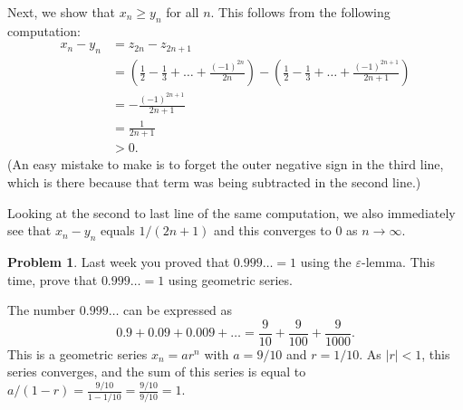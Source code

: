 \documentclass[11pt,oneside]{amsart}
\theoremstyle{definition}
\newtheorem{problem}{Problem}
\theoremstyle{plain}
\newcommand{\eps}{\varepsilon}
\begin{document}
\begin{solution}
        Next, we show that $x_n\geq y_n$ for all $n$. This follows from the following computation:
        \[\begin{split}
            x_n-y_n &= z_{2n}-z_{2n+1}\\
            &= \left(\frac 12-\frac13+\dots+\frac{(-1)^{2n}}{2n}\right)-\left(\frac 12-\frac13+\dots+\frac{(-1)^{2n+1}}{2n+1}\right)\\
            &= -\frac{(-1)^{2n+1}}{2n+1}\\
            &= \frac 1{2n+1}\\
            &>0.
        \end{split}\]
        (An easy mistake to make is to forget the outer negative sign in the third line, which is there because that term was being subtracted in the second line.)

        Looking at the second to last line of the same computation, we also immediately see that $x_n-y_n$ equals $1/(2n+1)$ and this converges to 0 as $n\to\infty$.
    \end{solution}

    \begin{problem}
        Last week you proved that $0.999\ldots=1$ using the $\eps$-lemma. This time, prove that $0.999\ldots=1$ using geometric series.
    \end{problem}
    \begin{solution}
        The number $0.999\ldots$ can be expressed as
        \[0.9+0.09+0.009+\dots=\frac 9{10}+\frac 9{100}+\frac 9{1000}.\]
        This is a geometric series $x_n=ar^n$ with $a=9/10$ and $r=1/10$. As $|r|<1$, this series converges, and the sum of this series is equal to $a/(1-r)=\frac{9/10}{1-1/10}=\frac{9/10}{9/10}=1$.
    \end{solution}
\end{document}

